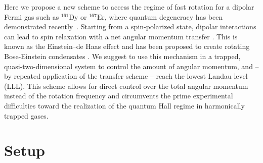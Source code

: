 Here we propose a new scheme to access the regime of fast rotation for a dipolar Fermi gas such as $^{161}\text{Dy}$ or $^{167}\text{Er}$, where quantum degeneracy has been demonstrated recently~\cite{Lu2012,Aikawa2014}. Starting from a spin-polarized state, dipolar interactions can lead to spin relaxation with a net angular momentum transfer \cite{Hensler2003}. This is known as the Einstein--de Haas effect \cite{Einstein1915} and has been proposed to create rotating Bose-Einstein condensates \cite{Santos2006,Kawaguchi2006}. We suggest to use this mechanism in a trapped, quasi-two-dimensional system to control the amount of angular momentum, and -- by repeated application of the transfer scheme -- reach the lowest Landau level (LLL). This scheme allows for direct control over the total angular momentum instead of the rotation frequency and circumvents the prime experimental difficulties toward the realization of the quantum Hall regime in harmonically trapped gases.






\section{Setup}

